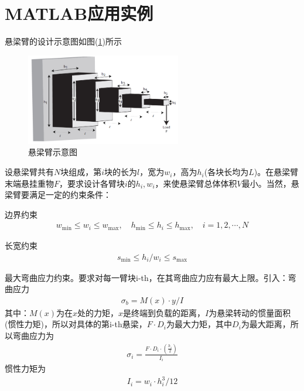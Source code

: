 \section{MATLAB应用实例}
    \par
    悬梁臂的设计示意图如图(\ref{fig:悬梁臂示意图})所示
        \begin{figure}[H]
        \centering
        \includegraphics[height=4cm]{images/hanging_beam.jpg}
        \caption{悬梁臂示意图}
        \label{fig:悬梁臂示意图}
        \end{figure}
    \par
    设悬梁臂共有$N$块组成，第$i$块的长为$l$，宽为$w_i$，高为$h_i$(各块长均为$L$)。在悬梁臂末端悬挂重物$F$，要求设计各臂块$i$的$h_i,w_i$，来使悬梁臂总体体积$V$最小。当然，悬梁臂要满足一定的约束条件：
    \par
    边界约束
        \begin{align*}
            w_{\min}\leqslant w_i\leqslant w_{\max},\quad h_{\min}\leqslant h_i\leqslant h_{\max},\quad i=1,2,\cdots,N
        \end{align*}
    \par
    长宽约束
        \begin{align*}
            s_{\min}\leqslant h_i/w_i\leqslant s_{\max}
        \end{align*}
    \par
    最大弯曲应力约束。要求对每一臂块i-th，在其弯曲应力应有最大上限。引入：弯曲应力
    \begin{align*}
        {\sigma}_b=M(x)\cdot y/I
    \end{align*}
    其中：$M(x)$为在$x$处的力矩，$x$是终端到负载的距离，$I$为悬梁转动的惯量面积(惯性力矩)，所以对具体的第i-th悬梁，$F\cdot D_i$为最大力矩，其中$D_i$为最大距离，所以弯曲应力为
    \begin{align*}
        {\sigma}_i=\frac{F\cdot D_i\cdot (\frac{h_i}{2})}{I_i}
    \end{align*}
    惯性力矩为
    \begin{align*}
        I_i=w_i\cdot h_i^3/12
    \end{align*}
